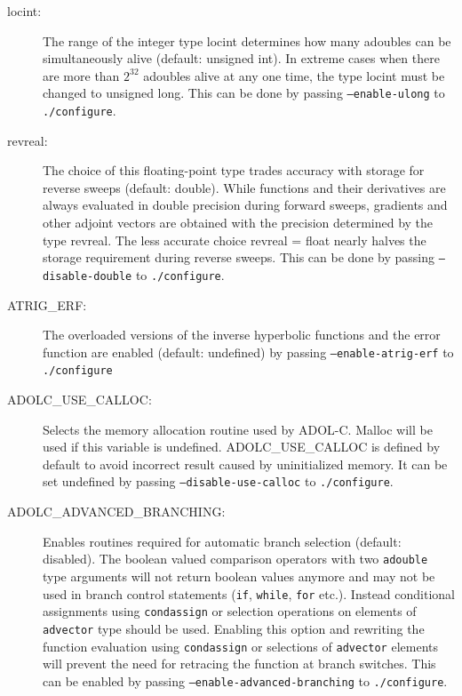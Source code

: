 \documentclass[11pt,twoside]{article}
\begin{document}
\begin{description}
\item[{\sf locint}{\rm :}] The range of the integer type 
{\sf locint} determines how many {\sf adouble}s can be simultaneously
alive (default: {\sf unsigned int}).  In extreme cases when there are more than $2^{32}$ {\sf adouble}s
alive at any one time, the type {\sf locint} must be changed to 
 {\sf unsigned long}. This can be done by passing
 \texttt{--enable-ulong} to \texttt{./configure}.

\item[{\sf revreal}{\rm :}] The choice of this floating-point type
trades accuracy with storage for reverse sweeps (default: {\sf double}). While functions
and their derivatives are always evaluated in double precision 
during forward sweeps, gradients and other adjoint vectors are obtained
with the precision determined by the type {\sf revreal}. The less
accurate choice {\sf revreal} = {\sf float} nearly halves the
storage requirement during reverse sweeps. This can be done by passing
\texttt{--disable-double} to \texttt{./configure}.

\item[{\sf ATRIG\_ERF}{\rm :}] The overloaded versions of the inverse
  hyperbolic functions and the error function are enabled (default:
  undefined) by passing \texttt{--enable-atrig-erf}
  to \texttt{./configure}

\item[{\sf ADOLC\_USE\_CALLOC}{\rm :}] Selects the memory allocation routine
  used by ADOL-C. {\sf Malloc} will be used if this variable is
  undefined. {\sf ADOLC\_USE\_CALLOC} is defined by default to avoid incorrect
  result caused by uninitialized memory. It can be set undefined by
  passing \texttt{--disable-use-calloc} to \texttt{./configure}.

\item[{\sf ADOLC\_ADVANCED\_BRANCHING}{\rm :}] Enables routines
  required for automatic branch selection (default: disabled). The
  boolean valued comparison operators with two \texttt{adouble} type
  arguments will not return boolean values anymore and may not be used
  in branch control statements (\texttt{if}, \texttt{while}, \texttt{for}
  etc.). Instead conditional assignments using \texttt{condassign} or
  selection operations on elements of \texttt{advector} type should be
  used. Enabling this option and rewriting the function evaluation
  using \texttt{condassign} or selections of \texttt{advector}
  elements will prevent the need for retracing the function at branch
  switches. This can be enabled by passing
  \texttt{--enable-advanced-branching} to \texttt{./configure}.
\end{description}
%
\end{document}
